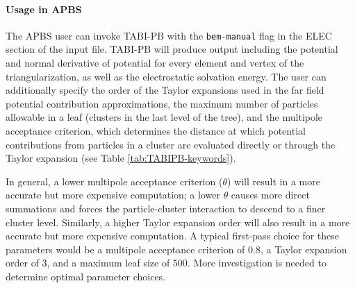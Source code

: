 \documentclass[11pt,titlepage]{article}
\begin{document}
\paragraph{Usage in APBS}
The APBS user can invoke TABI-PB with the \texttt{bem-manual} flag in the ELEC section of the input file. TABI-PB will produce output including the potential and normal derivative of potential for every element and vertex of the triangularization, as well as the electrostatic solvation energy. The user can additionally specify the order of the Taylor expansions used in the far field potential contribution approximations, the maximum number of particles allowable in a leaf (clusters in the last level of the tree), and the multipole acceptance criterion, which determines the distance at which potential contributions from particles in a cluster are evaluated directly or through the Taylor expansion (see Table \ref{tab:TABIPB-keywords}). 

In general, a lower multipole acceptance criterion ($\theta$) will result in a more accurate but more expensive computation; a lower $\theta$ causes more direct summations and forces the particle-cluster interaction to descend to a finer cluster level. Similarly, a higher Taylor expansion order will also result in a more accurate but more expensive computation. A typical first-pass choice for these parameters would be a multipole acceptance criterion of 0.8, a Taylor expansion order of 3, and a maximum leaf size of 500. More investigation is needed to determine optimal parameter choices.
\end{document}
